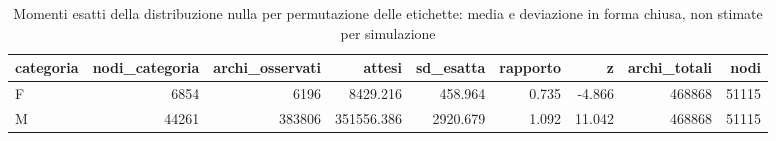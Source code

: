 \begin{table}
\centering
\caption{Momenti esatti della distribuzione nulla per permutazione delle etichette: media e deviazione in forma chiusa, non stimate per simulazione}
\label{tab:t4_permutazione_esatta}
\begin{tabular}{lrrrrrrrr}
\toprule
categoria &  nodi\_categoria &  archi\_osservati &     attesi &  sd\_esatta &  rapporto &      z &  archi\_totali &  nodi \\
\midrule
        F &            6854 &             6196 &   8429.216 &    458.964 &     0.735 & -4.866 &        468868 & 51115 \\
        M &           44261 &           383806 & 351556.386 &   2920.679 &     1.092 & 11.042 &        468868 & 51115 \\
\bottomrule
\end{tabular}
\end{table}
